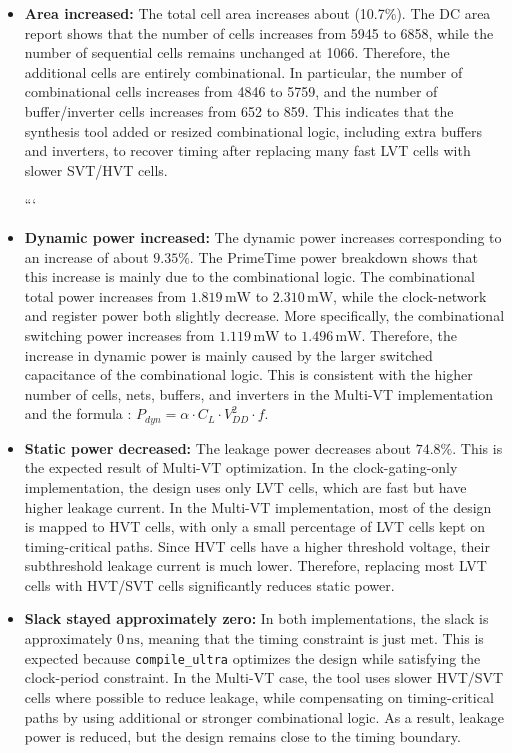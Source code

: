 \documentclass[11pt,a4paper]{article}
\begin{document}
\begin{itemize}
\item \textbf{Area increased:}
The total cell area increases about (10.7\%). The DC area report shows that the number of cells increases from 5945 to 6858, while the number of sequential cells remains unchanged at 1066. Therefore, the additional cells are entirely combinational. In particular, the number of combinational cells increases from 4846 to 5759, and the number of buffer/inverter cells increases from 652 to 859. This indicates that the synthesis tool added or resized combinational logic, including extra buffers and inverters, to recover timing after replacing many fast LVT cells with slower SVT/HVT cells.

```
\item \textbf{Dynamic power increased:}
The dynamic power increases corresponding to an increase of about \(9.35\%\). The PrimeTime power breakdown shows that this increase is mainly due to the combinational logic. The combinational total power increases from \(\num{1.819}\,\text{mW}\) to \(\num{2.310}\,\text{mW}\), while the clock-network and register power both slightly decrease. More specifically, the combinational switching power increases from \(\num{1.119}\,\text{mW}\) to \(\num{1.496}\,\text{mW}\). Therefore, the increase in dynamic power is mainly caused by the larger switched capacitance of the combinational logic. This is consistent with the higher number of cells, nets, buffers, and inverters in the Multi-VT implementation and the formula : $P_{dyn} = \alpha \cdot C_L \cdot V_{DD}^2 \cdot f$.

\item \textbf{Static power decreased:}
The leakage power decreases about \(74.8\%\). This is the expected result of Multi-VT optimization. In the clock-gating-only implementation, the design uses only LVT cells, which are fast but have higher leakage current. In the Multi-VT implementation, most of the design is mapped to HVT cells, with only a small percentage of LVT cells kept on timing-critical paths. Since HVT cells have a higher threshold voltage, their subthreshold leakage current is much lower. Therefore, replacing most LVT cells with HVT/SVT cells significantly reduces static power.

\item \textbf{Slack stayed approximately zero:}
In both implementations, the slack is approximately \(0\,\text{ns}\), meaning that the timing constraint is just met. This is expected because \texttt{compile\_ultra} optimizes the design while satisfying the clock-period constraint. In the Multi-VT case, the tool uses slower HVT/SVT cells where possible to reduce leakage, while compensating on timing-critical paths by using additional or stronger combinational logic. As a result, leakage power is reduced, but the design remains close to the timing boundary.


\end{itemize}
\end{document}
